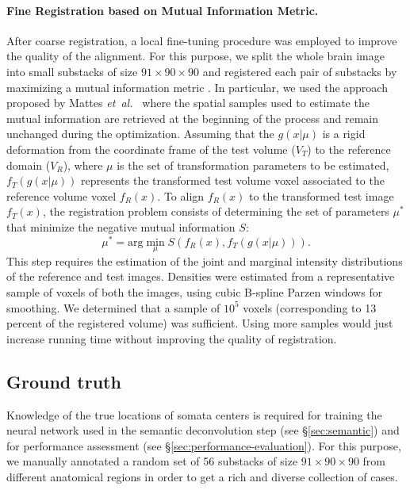 \documentclass[smallextended]{svjour3}       %
\newcommand{\etal}{\mbox{\emph{et al.\ }}}
\begin{document}
\paragraph{Fine Registration based on Mutual Information Metric.}
After coarse registration, a local fine-tuning procedure was employed to
improve the quality of the alignment. For this purpose, we split the
whole brain image into small substacks of size $91\times 90\times 90$ and registered
each pair of substacks by maximizing a mutual information metric
\cite{viola_alignment_1997}.
In particular, we used the approach proposed by Mattes \etal
\cite{mattes_nonrigid_2001} where the spatial samples used to
estimate the mutual information are retrieved at the beginning of the
process and remain unchanged during the optimization.
Assuming that the $g(x|\mu)$
is a rigid deformation from the coordinate frame of the test volume
($V_T$) to the reference domain ($V_R$), where $\mu$ is the set of
transformation parameters to be estimated, $f_T (g(x|\mu))$ represents
the transformed test volume voxel associated to the reference volume
voxel $f_R(x)$. To align $f_R(x)$ to the transformed test image
$f_T(x)$, the registration problem consists of determining the set of
parameters $\mu^{*}$ that minimize the negative mutual information $S$:
\begin{equation}
\mu^*=\mathrm{arg}\min_{\mu}S(f_R(x),f_T(g(x|\mu))).
\end{equation}
This step requires the estimation of the joint and
marginal intensity distributions of the reference and test images. Densities were estimated
from a representative sample of voxels of
both the images, using cubic B-spline Parzen
windows for smoothing. %
We determined that a sample of $10^5$ voxels (corresponding to 13 percent of the registered
volume) was sufficient. Using more samples would just increase running time without improving the
quality of registration.


\subsection{Ground truth}
\label{sec:ground-truth}
Knowledge of the true locations of somata centers is required for training the neural network
used in the semantic deconvolution step (see \S\ref{sec:semantic}) and for performance assessment (see
\S\ref{sec:performance-evaluation}).  For this purpose, we manually annotated a
random set of 56 substacks of size $91\times 90\times 90$ from
different anatomical regions in order to get a rich and diverse
collection of cases.
\end{document}
